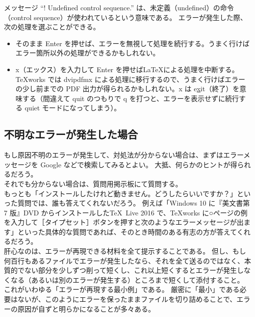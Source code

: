 メッセージ ``! Undefined control sequence.'' は、未定義（undefined）の命令（control sequence）が使われているという意味である。
エラーが発生した際、次の処理を選ぶことができる。
\begin{itemize}\setlength{\leftskip}{-1.00zw}%
\item そのまま Enter を押せば、エラーを無視して処理を続行する。うまく行けばエラー箇所以外の処理ができるかもしれない。
\item x（エックス）を入力して Enter を押せば\LaTeX{}による処理を中断する。\TeX{}works では dvipdfmx による処理に移行するので、うまく行けばエラーの少し前までの PDF 出力が得られるかもしれない。x は e\underline{x}it（終了）を意味する（間違えて quit のつもりで q を打つと、エラーを表示せずに続行する quiet モードになってしまう）。
\end{itemize}
\subsection{不明なエラーが発生した場合}
もし原因不明のエラーが発生して、対処法が分からない場合は、まずはエラーメッセージを Google などで検索してみるとよい。
大抵、何らかのヒントが得られるだろう。\\

それでも分からない場合は、質問用掲示板にて質問する。\\

もっとも「インストールしたけれど動きません。どうしたらいいですか？」といった質問では、誰も答えてくれないだろう。
例えば「Windows 10 に『美文書第 7 版』DVD からインストールした\TeX~Live 2016 で、\TeX{}works に○ページの例を入力して［タイプセット］ボタンを押すと次のようなエラーメッセージが出ます」といった具体的な質問であれば、そのとき時間のある有志の方が答えてくれるだろう。\\

肝心なのは、エラーが再現できる材料を全て提示することである。
但し、もし何百行もあるファイルでエラーが発生したなら、それを全て送るのではなく、本質的でない部分を少しずつ削って短くし、これ以上短くするとエラーが発生しなくなる（あるいは別のエラーが発生する）ところまで短くして添付すること。
これがいわゆる「エラーが再現する最小例」である。
厳密に「最小」である必要はないが、このようにエラーを保ったままファイルを切り詰めることで、エラーの原因が自ずと明らかになることが多々ある。

